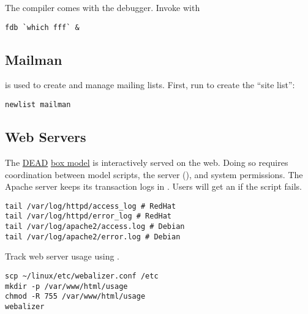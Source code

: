 \documentclass[12pt,twoside]{article}
\begin{document}
The   compiler comes with the 
debugger. 
Invoke with 
\begin{verbatim}
fdb `which fff` &
\end{verbatim}

\subsection{Mailman}\label{sxn:mlm}
 is used to create and manage mailing lists.
First, run  to create the ``site list'':
\begin{verbatim}
newlist mailman
\end{verbatim}

\subsection{Web Servers}\label{sxn:www}
The \href{http://dust.ess.uci.edu/dead}{DEAD}
\href{http://dust.ess.uci.edu/dead/bxm_home.html}{box model}
is interactively served on the web. 
Doing so requires coordination between model scripts, the
 server (), and system permissions.
The Apache server keeps its transaction logs in
.
Users will get an  if the  
script fails. 
\begin{verbatim}
tail /var/log/httpd/access_log # RedHat
tail /var/log/httpd/error_log # RedHat
tail /var/log/apache2/access.log # Debian
tail /var/log/apache2/error.log # Debian
\end{verbatim}
Track web server usage using .
\begin{verbatim}
scp ~/linux/etc/webalizer.conf /etc
mkdir -p /var/www/html/usage
chmod -R 755 /var/www/html/usage
webalizer
\end{verbatim}
\end{document}
